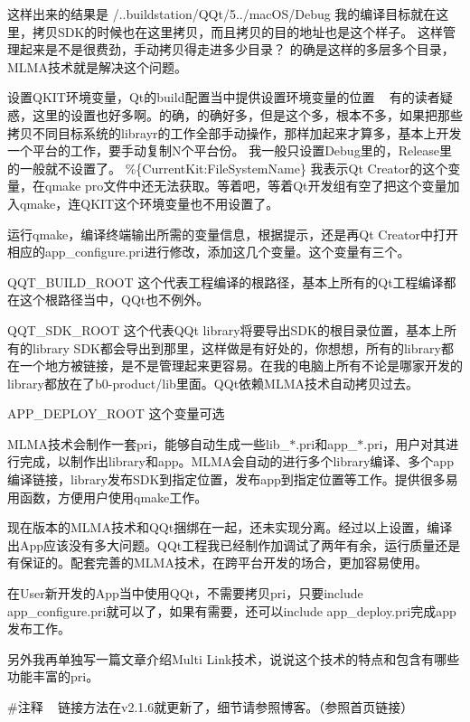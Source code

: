 这样出来的结果是 /..buildstation/\+Q\+Qt/5../mac\+O\+S/\+Debug 我的编译目标就在这里，拷贝\+S\+D\+K的时候也在这里拷贝，而且拷贝的目的地址也是这个样子。 这样管理起来是不是很费劲，手动拷贝得走进多少目录？ 的确是这样的多层多个目录，\+M\+L\+M\+A技术就是解决这个问题。


\begin{DoxyItemize}
\item 设置\+Q\+K\+I\+T环境变量，\+Qt的build配置当中提供设置环境变量的位置 ~\newline
 有的读者疑惑，这里的设置也好多啊。的确，的确好多，但是这个多，根本不多，如果把那些拷贝不同目标系统的librayr的工作全部手动操作，那样加起来才算多，基本上开发一个平台的工作，要手动复制\+N个平台份。 我一般只设置\+Debug里的，\+Release里的一般就不设置了。 \%\{Current\+Kit\+:File\+System\+Name\} 我表示\+Qt Creator的这个变量，在qmake pro文件中还无法获取。等着吧，等着\+Qt开发组有空了把这个变量加入qmake，连\+Q\+K\+I\+T这个环境变量也不用设置了。
\item 运行qmake，编译终端输出所需的变量信息，根据提示，还是再\+Qt Creator中打开相应的app\+\_\+configure.\+pri进行修改，添加这几个变量。这个变量有三个。
\begin{DoxyItemize}
\item Q\+Q\+T\+\_\+\+B\+U\+I\+L\+D\+\_\+\+R\+O\+OT 这个代表工程编译的根路径，基本上所有的\+Qt工程编译都在这个根路径当中，\+Q\+Qt也不例外。
\item Q\+Q\+T\+\_\+\+S\+D\+K\+\_\+\+R\+O\+OT 这个代表\+Q\+Qt library将要导出\+S\+D\+K的根目录位置，基本上所有的library S\+D\+K都会导出到那里，这样做是有好处的，你想想，所有的library都在一个地方被链接，是不是管理起来更容易。在我的电脑上所有不论是哪家开发的library都放在了b0-\/product/lib里面。\+Q\+Qt依赖\+M\+L\+M\+A技术自动拷贝过去。
\item A\+P\+P\+\_\+\+D\+E\+P\+L\+O\+Y\+\_\+\+R\+O\+OT 这个变量可选
\end{DoxyItemize}
\end{DoxyItemize}

M\+L\+M\+A技术会制作一套pri，能够自动生成一些lib\+\_\+$\ast$.pri和app\+\_\+$\ast$.pri，用户对其进行完成，以制作出library和app。\+M\+L\+M\+A会自动的进行多个library编译、多个app编译链接，library发布\+S\+D\+K到指定位置，发布app到指定位置等工作。提供很多易用函数，方便用户使用qmake工作。

现在版本的\+M\+L\+M\+A技术和\+Q\+Qt捆绑在一起，还未实现分离。经过以上设置，编译出\+App应该没有多大问题。\+Q\+Qt工程我已经制作加调试了两年有余，运行质量还是有保证的。配套完善的\+M\+L\+M\+A技术，在跨平台开发的场合，更加容易使用。

在\+User新开发的\+App当中使用\+Q\+Qt，不需要拷贝pri，只要include app\+\_\+configure.\+pri就可以了，如果有需要，还可以include app\+\_\+deploy.\+pri完成app发布工作。

另外我再单独写一篇文章介绍\+Multi Link技术，说说这个技术的特点和包含有哪些功能丰富的pri。

\#注释 ~\newline
 链接方法在v2.1.\+6就更新了，细节请参照博客。（参照首页链接） 